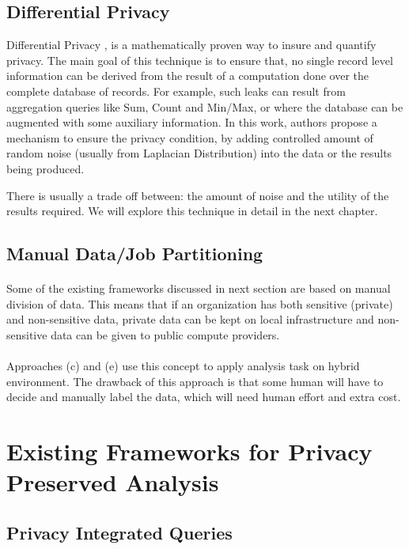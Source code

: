 \documentclass{report}
\begin{document}
\subsection{Differential Privacy}
Differential Privacy \cite{Dwork:2006:DP:2097282.2097284}, is a mathematically proven way to insure and quantify privacy. The main goal of this technique is to ensure that, no single record level information can be derived from the result of a computation done over the complete database of records. For example, such leaks can result from aggregation queries like Sum, Count and Min/Max, or where the database can be augmented with some auxiliary information. In this work, authors propose a mechanism to ensure the privacy condition, by adding controlled amount of random noise (usually from Laplacian Distribution) into the data or the results being produced.

There is usually a trade off between: the amount of noise and the utility of the results required. We will explore this technique in detail in the next chapter.


\subsection{Manual Data/Job Partitioning}
\paragraph{}
Some of the existing frameworks discussed in next section are based on manual division of data. This means that if an organization has both sensitive (private) and non-sensitive data, private data can be kept on local infrastructure and non-sensitive data can be given to public compute providers.
\paragraph{}
Approaches \cite{zhang2011sedic}\cite{xu2015framework} (c) and \cite{ko2011hybrex} (e) use this concept to apply analysis task on hybrid environment.
The drawback of this approach is that some human will have to decide and manually label the data, which will need human effort and extra cost.



\section{Existing Frameworks for Privacy Preserved Analysis}
\subsection{Privacy Integrated Queries}
\end{document}
